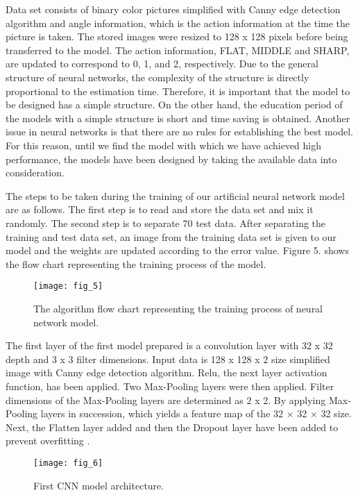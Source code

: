 \documentclass[twocolumn, switch]{article} %
\begin{document}
Data set consists of binary color pictures simplified with
Canny edge detection algorithm and angle information,
which is the action information at the time the picture is
taken. The stored images were resized to 128 x 128 pixels
before being transferred to the model. The action
information, FLAT, MIDDLE and SHARP, are updated to
correspond to 0, 1, and 2, respectively. Due to the general
structure of neural networks, the complexity of the structure
is directly proportional to the estimation time. Therefore, it
is important that the model to be designed has a simple
structure. On the other hand, the education period of the
models with a simple structure is short and time saving is
obtained. Another issue in neural networks is that there are
no rules for establishing the best model. For this reason, until
we find the model with which we have achieved high
performance, the models have been designed by taking the
available data into consideration.

The steps to be taken during the training of our artificial
neural network model are as follows. The first step is to read
and store the data set and mix it randomly. The second step
is to separate 70%
test data. After separating the training and test data set, an
image from the training data set is given to our model and
the weights are updated according to the error value. Figure
5. shows the flow chart representing the training process of
the model.

\begin{figure}[h]
    \centering
    \texttt{[image: fig\_5]}
    \caption{The algorithm flow chart representing the training
process of neural network model.}
    \label{fig:fig5}
\end{figure}

The first layer of the first model prepared is a convolution
layer with 32 x 32 depth and 3 x 3 filter dimensions. Input
data is 128 x 128 x 2 size simplified image with Canny edge
detection algorithm. Relu, the next layer activation function,
has been applied. Two Max-Pooling layers were then
applied. Filter dimensions of the Max-Pooling layers are
determined as 2 x 2. By applying Max-Pooling layers in
succession, which yields a feature map of the 32 × 32 × 32
size. Next, the Flatten layer added and then the Dropout layer
have been added to prevent overfitting \cite{srivastava2014dropout}.

\begin{figure}[h]
    \centering
    \texttt{[image: fig\_6]}
    \caption{First CNN model architecture.}
    \label{fig:fig6}
\end{figure}
\end{document}
